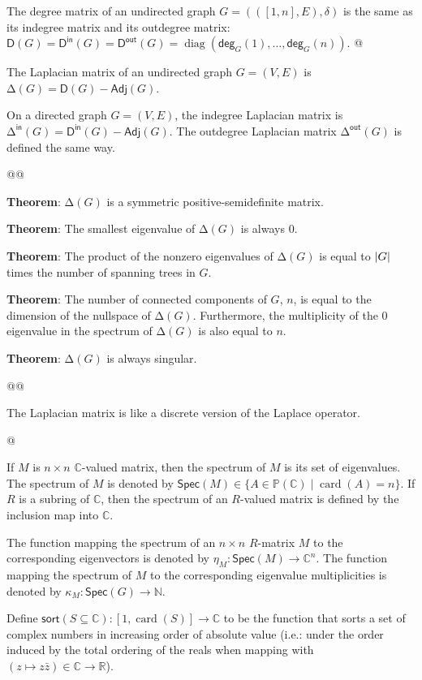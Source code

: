 \documentclass[]{article}
\DeclarePairedDelimiter{\abs}{\lvert}{\rvert}
\newcommand{\textbs}[1]{{\sffamily\fontseries{sbc}\selectfont #1}}
\newcommand{\mbb}[1]{\ensuremath{\mathbb{#1}}}     %
\newcommand{\msf}[1]{\ensuremath{\mathsf{#1}}}     %
\DeclareMathOperator{\card}{card}
\newcommand{\degree}[3]{\ensuremath{\msf{deg}_{#2}^{#1}(#3)}}
\DeclareMathOperator{\diag}{diag}
\newcommand{\define}[1]{\textbs{#1}}
\newcommand{\sfixme}[0]{%
  \begin{minipage}[c]{3.5em}%
  \todo[color=green!40,inline]{\textsc{fixme}}%
  \end{minipage}}
\begin{document}
\begin{refsection}
\begin{easylist}[itemize]
{  The \define{degree matrix} of an undirected graph $G = (([1, n], E), \delta)$
  is the same as its indegree matrix and its outdegree matrix:
  $ \msf{D}(G)
  = \msf{D}^\msf{in}(G)
  = \msf{D}^\msf{out}(G)
  = \diag(\degree{}{G}{1}, \dotsc, \degree{}{G}{n})$.
}
@ {%
  The \define{Laplacian matrix} of an undirected graph $G = (V, E)$
  is $\mathrm{\Delta}(G) = \msf{D}(G) - \msf{Adj}(G)$.

  On a directed graph $G = (V, E)$, the \define{indegree Laplacian matrix}
  is $\mathrm{\Delta}^\msf{in}(G) = \msf{D}^\msf{in}(G) - \msf{Adj}(G)$.
  The \define{outdegree Laplacian matrix} $\mathrm{\Delta}^\msf{out}(G)$
  is defined the same way.
}
@@ {%
  \textbf{Theorem}:
  $\mathrm{\Delta}(G)$ is a symmetric positive-semidefinite matrix.

  \textbf{Theorem}:
  The smallest eigenvalue of $\mathrm{\Delta}(G)$ is always $0$.

  \textbf{Theorem}:
  The product of the nonzero eigenvalues of $\mathrm{\Delta}(G)$ is equal to
  $\abs{G}$ times the number of spanning trees in $G$.

  \textbf{Theorem}:
  The number of connected components of $G$, $n$, is equal to the
  dimension of the nullspace of $\mathrm{\Delta}(G)$.
  Furthermore, the multiplicity of the $0$ eigenvalue in the spectrum of
  $\mathrm{\Delta}(G)$ is also equal to $n$.

  \textbf{Theorem}:
  $\mathrm{\Delta}(G)$ is always singular.
}
@@ {%
  The Laplacian matrix is like a discrete version of the Laplace operator.
  \sfixme{}
}
@ {%
  If $M$ is $n \times n$ $\mbb{C}$-valued matrix, then the \define{spectrum} of
  $M$ is its set of eigenvalues. The spectrum of $M$ is denoted by
  $\msf{Spec}(M) \in \{A \in \mbb{P}(\mbb{C}) \mid \card(A) = n\}$.
  If $R$ is a subring of $\mbb{C}$, then the spectrum of an $R$-valued matrix
  is defined by the inclusion map into $\mbb{C}$.

  The function mapping the spectrum of an $n \times n$ $R$-matrix $M$
  to the corresponding eigenvectors is denoted by
  $\eta_M : \msf{Spec}(M) \to \mbb{C}^n$.
  The function mapping the spectrum of $M$ to the corresponding eigenvalue
  multiplicities is denoted by $\kappa_M : \msf{Spec}(G) \to \mbb{N}$.

  Define $\msf{sort}(S \subseteq \mbb{C}) : [1, \card(S)] \to \mbb{C}$
  to be the function that sorts a set of complex numbers in increasing order
  of absolute value (i.e.: under the order induced by the total ordering of the
  reals when mapping with $(z \mapsto z \bar{z}) \in \mbb{C} \to \mbb{R}$).

}
\end{easylist}
\end{refsection}
\end{document}
